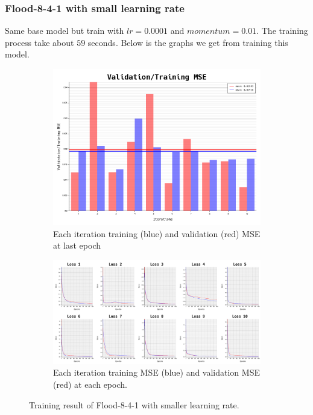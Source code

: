 \documentclass{article}
\begin{document}
\newpage
\subsubsection*{Flood-8-4-1 with small learning rate}
Same base model but train with $lr = 0.0001$ and $momentum = 0.01$.
The training process take about $59$ seconds.
Below is the graphs we get from training this model. 
\begin{figure}[ht]
	\begin{subfigure}{\textwidth}
		\centering
		\includegraphics[scale=0.3]{flood-8-4-1_3/cv_l}
		\caption{Each iteration training (blue) and validation (red) MSE at last epoch}
		\label{fig:4a}
	\end{subfigure}
	\begin{subfigure}{\textwidth}
		\includegraphics[width=\textwidth]{flood-8-4-1_3/loss}
		\caption{Each iteration training MSE (blue) and validation MSE (red) at each epoch.}
		\label{fig:4b}
	\end{subfigure}
	\caption{Training result of Flood-8-4-1 with smaller learning rate.}
	\label{fig:4}
\end{figure}
\FloatBarrier
\end{document}

